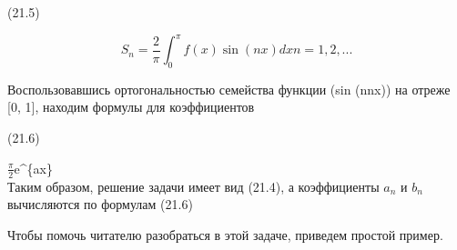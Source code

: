 \documentclass[
  ukrainian,
]{article}
\begin{document}
(21.5)

\[
S_n = \frac{2}{\pi} \int_{0}^{\pi} f(x) \sin(nx) dx
n = 1, 2, ...
\]

Воспользовавшись ортогональностью семейства функции (sin (nnx)) на
отреже {[}0, 1{]}, находим формулы для коэффициентов

(21.6)

\(\frac{\pi}{2}\)e\^{}\{ax\}\[
\] Таким образом, решение задачи имеет вид (21.4), а коэффициенты
\(a_n\) и \(b_n\) вычисляются по формулам (21.6)

Чтобы помочь читателю разобраться в этой задаче, приведем простой
пример.
\end{document}
